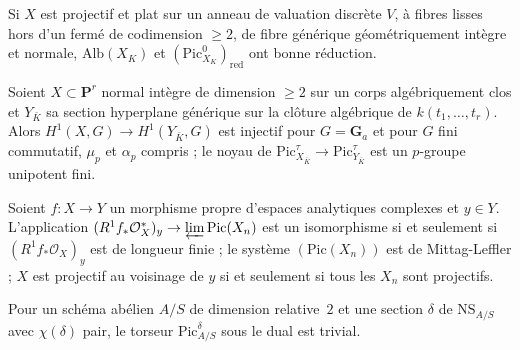 \begin{encadre}
\begin{theoreme*}\nonverifie
Si $X$ est projectif et plat sur un anneau de valuation discrète $V$, à fibres lisses hors d'un fermé de codimension $\geq 2$, de fibre générique géométriquement intègre et normale, $\mathrm{Alb}(X_K)$ et $(\mathrm{Pic}^0_{X_K})_{\mathrm{red}}$ ont bonne réduction.
\end{theoreme*}
\end{encadre}

\begin{encadre}
\begin{theoreme*}\nonverifie
Soient $X \subset \mathbf P^r$ normal intègre de dimension $\geq 2$ sur un corps algébriquement clos et $Y_{\bar K}$ sa section hyperplane générique sur la clôture algébrique de $k(t_1, \ldots, t_r)$. Alors $H^1(X, G) \to H^1(Y_{\bar K}, G)$ est injectif pour $G = \mathbf G_a$ et pour $G$ fini commutatif, $\mu_p$ et $\alpha_p$ compris ; le noyau de $\mathrm{Pic}^\tau_{X_{\bar K}} \to \mathrm{Pic}^\tau_{Y_{\bar K}}$ est un $p$-groupe unipotent fini.
\end{theoreme*}
\end{encadre}

\begin{encadre}
\begin{theoreme*}\nonverifie
Soient $f : X \to Y$ un morphisme propre d'espaces analytiques complexes et $y \in Y$. L'application $(R^1f_*\mathcal O^*_X)_y \to \varprojlim \mathrm{Pic}(X_n)$ est un isomorphisme si et seulement si $(R^1f_*\mathcal O_X)_y$ est de longueur finie ; le système $(\mathrm{Pic}(X_n))$ est de Mittag-Leffler ; $X$ est projectif au voisinage de $y$ si et seulement si tous les $X_n$ sont projectifs.
\end{theoreme*}
\end{encadre}

\begin{encadre}
\begin{theoreme*}\nonverifie
Pour un schéma abélien $A/S$ de dimension relative~$2$ et une section $\delta$ de $\mathrm{NS}_{A/S}$ avec $\chi(\delta)$ pair, le torseur $\mathrm{Pic}^\delta_{A/S}$ sous le dual est trivial.
\end{theoreme*}
\end{encadre}

